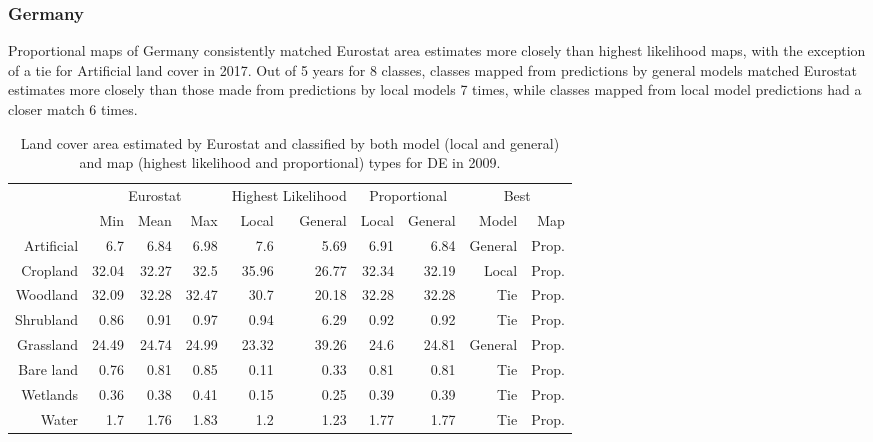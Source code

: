     \subsubsection{Germany}
    Proportional maps of Germany consistently matched Eurostat area estimates more closely than highest likelihood maps, with the exception of a tie for Artificial land cover in 2017. Out of 5 years for 8 classes, classes mapped from predictions by general models matched Eurostat estimates more closely than those made from predictions by local models 7 times, while classes mapped from local model predictions had a closer match 6 times.
    \begin{table}[H]
    \centering
    \caption{Land cover area estimated by Eurostat and classified by both model (local and general) and map (highest likelihood and proportional) types for DE in 2009.}
    
    \begin{tabular}{r|rrr|rr|rr|rr}
    \toprule
    {} & \multicolumn{3}{|c}{Eurostat} & \multicolumn{2}{|c}{Highest Likelihood} & \multicolumn{2}{|c}{Proportional} & \multicolumn{2}{|c}{Best} \\
    {} &      Min &   Mean &    Max &              Local & General &        Local & General &    Model &    Map \\
    \midrule
    Artificial &      6.7 &   6.84 &   6.98 &                7.6 &    5.69 &         6.91 &    6.84 &  General &  Prop. \\
    Cropland   &    32.04 &  32.27 &   32.5 &              35.96 &   26.77 &        32.34 &   32.19 &    Local &  Prop. \\
    Woodland   &    32.09 &  32.28 &  32.47 &               30.7 &   20.18 &        32.28 &   32.28 &      Tie &  Prop. \\
    Shrubland  &     0.86 &   0.91 &   0.97 &               0.94 &    6.29 &         0.92 &    0.92 &      Tie &  Prop. \\
    Grassland  &    24.49 &  24.74 &  24.99 &              23.32 &   39.26 &         24.6 &   24.81 &  General &  Prop. \\
    Bare land  &     0.76 &   0.81 &   0.85 &               0.11 &    0.33 &         0.81 &    0.81 &      Tie &  Prop. \\
    Wetlands   &     0.36 &   0.38 &   0.41 &               0.15 &    0.25 &         0.39 &    0.39 &      Tie &  Prop. \\
    Water      &      1.7 &   1.76 &   1.83 &                1.2 &    1.23 &         1.77 &    1.77 &      Tie &  Prop. \\
    \bottomrule
    \end{tabular}
    \end{table}
    
